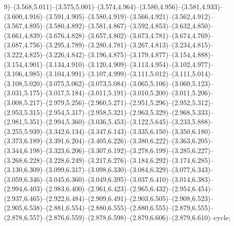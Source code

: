 9)--(3.568,5.011)--(3.575,5.001)--(3.574,4.964)--(3.580,4.956)--(3.581,4.933)--(3.600,4.916)--(3.591,4.905)--(3.580,4.919)--(3.566,4.921)--(3.562,4.912)--(3.567,4.895)--(3.580,4.892)--(3.581,4.867)--(3.592,4.853)--(3.632,4.850)--(3.661,4.839)--(3.676,4.828)--(3.657,4.802)--(3.673,4.781)--(3.674,4.769)--(3.687,4.756)--(3.295,4.789)--(3.280,4.781)--(3.267,4.813)--(3.234,4.815)--(3.222,4.825)--(3.226,4.842)--(3.196,4.875)--(3.179,4.877)--(3.154,4.888)--(3.154,4.901)--(3.134,4.910)--(3.120,4.909)--(3.113,4.954)--(3.102,4.977)--(3.106,4.985)--(3.104,4.991)--(3.107,4.999)--(3.111,5.012)--(3.111,5.014)--(3.108,5.020)--(3.075,5.062)--(3.073,5.084)--(3.065,5.106)--(3.060,5.123)--(3.031,5.175)--(3.017,5.184)--(3.011,5.191)--(3.010,5.200)--(3.011,5.206)--(3.008,5.217)--(2.979,5.256)--(2.960,5.271)--(2.951,5.296)--(2.952,5.312)--(2.953,5.315)--(2.954,5.317)--(2.958,5.321)--(2.963,5.329)--(2.968,5.333)--(2.981,5.351)--(2.994,5.360)--(3.036,5.453)--(3.122,5.645)--(3.233,5.888)--(3.255,5.939)--(3.342,6.134)--(3.347,6.143)--(3.335,6.150)--(3.350,6.180)--(3.373,6.189)--(3.391,6.204)--(3.405,6.226)--(3.380,6.222)--(3.363,6.205)--(3.344,6.198)--(3.323,6.206)--(3.307,6.192)--(3.278,6.199)--(3.285,6.227)--(3.268,6.228)--(3.228,6.249)--(3.217,6.276)--(3.184,6.292)--(3.174,6.285)--(3.130,6.309)--(3.099,6.317)--(3.098,6.330)--(3.084,6.329)--(3.077,6.343)--(3.059,6.346)--(3.045,6.360)--(3.049,6.395)--(3.037,6.410)--(3.014,6.383)--(2.994,6.403)--(2.983,6.400)--(2.961,6.423)--(2.965,6.432)--(2.954,6.454)--(2.937,6.465)--(2.922,6.484)--(2.909,6.491)--(2.903,6.505)--(2.908,6.523)--(2.905,6.538)--(2.881,6.554)--(2.880,6.555)--(2.880,6.555)--(2.879,6.555)--(2.878,6.557)--(2.876,6.559)--(2.878,6.598)--(2.879,6.606)--(2.879,6.610)--cycle;
